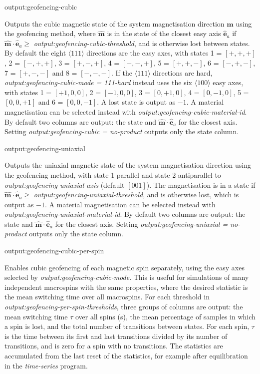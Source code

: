 {\zicf output:geofencing-cubic} Outputs the cubic magnetic state of the system magnetisation direction $\hat{\mathbf{m}}$ using the geofencing method, where $\hat{\mathbf{m}}$ is in the state of the closest easy axis $\hat{\mathbf{e}}_a$ if $\hat{\mathbf{m}}\cdot\hat{\mathbf{e}}_a \ge$ \textit{output:geofencing-cubic-threshold}, and is otherwise lost between states. By default the eight $\langle 111 \rangle$ directions are the easy axes, with states 1 = $[+,+,+]$, 2 = $[-,+,+]$, 3 = $[+,-,+]$, 4 = $[-,-,+]$, 5 = $[+,+,-]$, 6 = $[-,+,-]$, 7 = $[+,-,-]$ and 8 = $[-,-,-]$. If the $\langle 111 \rangle$ directions are hard, \textit{output:geofencing-cubic-mode = 111-hard} instead uses the six $\langle 100 \rangle$ easy axes, with states 1 = $[+1,0,0]$, 2 = $[-1,0,0]$, 3 = $[0,+1,0]$, 4 = $[0,-1,0]$, 5 = $[0,0,+1]$ and 6 = $[0,0,-1]$. A lost state is output as $-1$. A material magnetisation can be selected instead with \textit{output:geofencing-cubic-material-id}. By default two columns are output: the state and $\hat{\mathbf{m}}\cdot\hat{\mathbf{e}}_a$ for the closest axis. Setting \textit{output:geofencing-cubic = no-product} outputs only the state column.

{\zicf output:geofencing-uniaxial} Outputs the uniaxial magnetic state of the system magnetisation direction using the geofencing method, with state 1 parallel and state 2 antiparallel to \textit{output:geofencing-uniaxial-axis} (default $[001]$). The magnetisation is in a state if $\hat{\mathbf{m}}\cdot\hat{\mathbf{e}}_a \ge$ \textit{output:geofencing-uniaxial-threshold}, and is otherwise lost, which is output as $-1$. A material magnetisation can be selected instead with \textit{output:geofencing-uniaxial-material-id}. By default two columns are output: the state and $\hat{\mathbf{m}}\cdot\hat{\mathbf{e}}_a$ for the closest axis. Setting \textit{output:geofencing-uniaxial = no-product} outputs only the state column.

{\zicf output:geofencing-cubic-per-spin} Enables cubic geofencing of each magnetic spin separately, using the easy axes selected by \textit{output:geofencing-cubic-mode}. This is useful for simulations of many independent macrospins with the same properties, where the desired statistic is the mean switching time over all macrospins. For each threshold in \textit{output:geofencing-per-spin-thresholds}, three groups of columns are output: the mean switching time $\tau$ over all spins (s), the mean percentage of samples in which a spin is lost, and the total number of transitions between states. For each spin, $\tau$ is the time between its first and last transitions divided by its number of transitions, and is zero for a spin with no transitions. The statistics are accumulated from the last reset of the statistics, for example after equilibration in the \textit{time-series} program.

